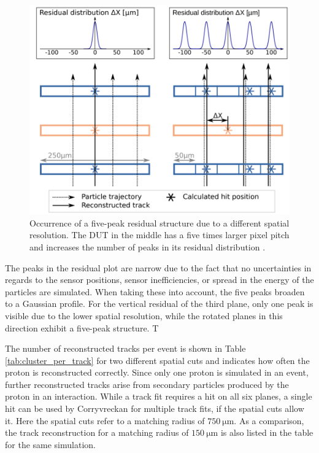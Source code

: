 \begin{figure}
  \centering
  \includegraphics[height=0.6\textwidth]{images/peaks.png}
  \caption{Occurrence of a five-peak residual structure due to a different spatial resolution. The DUT in the middle
  has a five times larger pixel pitch and increases the number of peaks in its residual distribution \cite{peaks}.}
  \label{fig:peaks}
\end{figure}

The peaks in the residual plot are narrow due to the fact that no uncertainties in regards
to the sensor positions, sensor inefficiencies, or spread in the energy of the particles are simulated. When taking these into account, the
five peaks broaden to a Gaussian profile.
For the vertical residual of the third plane, only one peak is visible due to the lower spatial resolution, while the rotated planes
in this direction exhibit a five-peak structure. T

The number of reconstructed tracks per event is shown in Table \ref{tab:cluster_per_track} for two different spatial cuts and indicates how often the proton is
reconstructed correctly. Since only one proton is simulated in an event, further reconstructed tracks arise from secondary
particles produced by the proton in an interaction. While a track fit requires a hit on all six planes, a single hit can be used by
Corryvreckan for multiple track fits, if the spatial cuts allow it. Here the spatial cuts refer to a matching radius of $\SI{750}{\micro\meter}$.
As a comparison, the track reconstruction for a matching radius of $\SI{150}{\micro\meter}$ is also listed in the table for the same
simulation.

